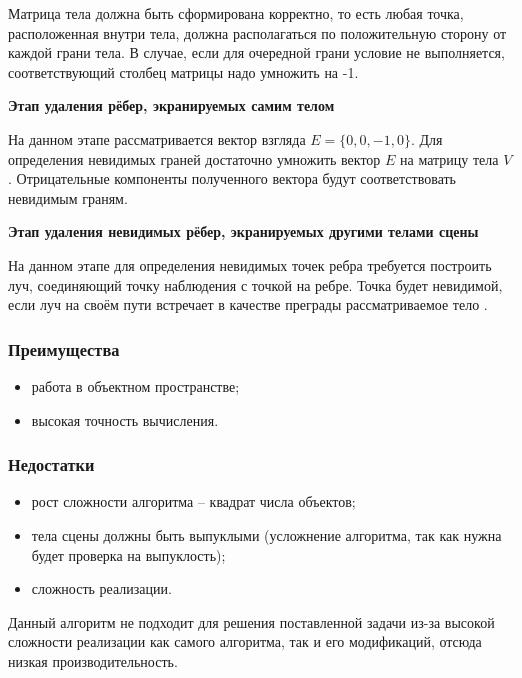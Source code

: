 Матрица тела должна быть сформирована корректно, то есть любая точка, расположенная внутри тела, должна располагаться по положительную сторону от каждой грани тела. В случае, если для очередной грани условие не выполняется, соответствующий столбец матрицы надо умножить на -1. 

\textbf{Этап удаления рёбер, экранируемых самим телом}

На данном этапе рассматривается вектор взгляда $E=\{0, 0,-1, 0\}$.
Для определения невидимых граней достаточно умножить вектор $E$ на матрицу тела $V$. Отрицательные компоненты полученного вектора будут соответствовать невидимым граням.

\textbf{Этап удаления невидимых рёбер, экранируемых другими телами сцены}

На данном этапе для определения невидимых точек ребра требуется построить луч, соединяющий точку наблюдения с точкой на ребре. Точка будет невидимой, если луч на своём пути встречает в качестве преграды рассматриваемое тело \cite{roberts}.

\subsubsection*{Преимущества}
\begin{itemize}
	\item работа в объектном пространстве;
	\item высокая точность вычисления.
\end{itemize}

\subsubsection*{Недостатки}
\begin{itemize}
	\item рост сложности алгоритма – квадрат числа объектов;
	\item тела сцены должны быть выпуклыми (усложнение алгоритма, так как нужна будет проверка на выпуклость);
	\item сложность реализации.
\end{itemize}

Данный алгоритм не подходит для решения поставленной задачи из-за высокой сложности реализации как самого алгоритма, так и его модификаций, отсюда низкая производительность.


